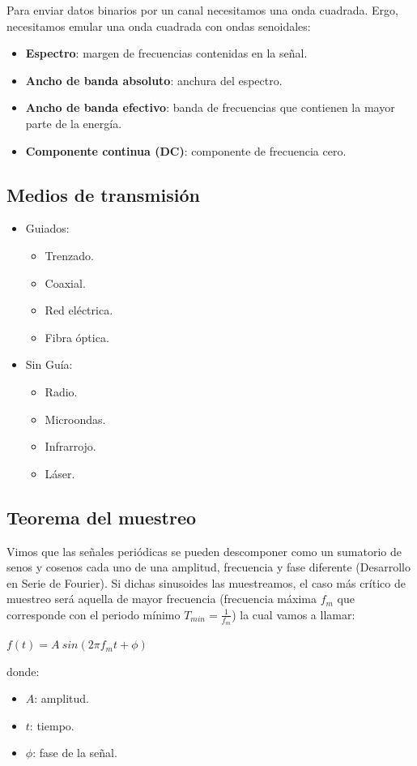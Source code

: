 \documentclass[]{article}
\begin{document}
Para enviar datos binarios por un canal necesitamos una onda cuadrada. Ergo, necesitamos emular una onda cuadrada con ondas senoidales:


\begin{itemize}
    \item \textbf{Espectro}: margen de frecuencias contenidas en la señal.
    \item \textbf{Ancho de banda absoluto}: anchura del espectro.
    \item \textbf{Ancho de banda efectivo}: banda de frecuencias que contienen la mayor parte de la energía.
    \item \textbf{Componente continua (DC)}: componente de frecuencia cero.
\end{itemize}

\subsection{Medios de transmisión}
\begin{itemize}
    \item Guiados:
    \begin{itemize}
        \item Trenzado.
        \item Coaxial.
        \item Red eléctrica.
        \item Fibra óptica.
    \end{itemize}
    \item Sin Guía:
    \begin{itemize}
        \item Radio.
        \item Microondas.
        \item Infrarrojo.
        \item Láser.
    \end{itemize}
\end{itemize}

\subsection{Teorema del muestreo}
Vimos que las señales periódicas se pueden descomponer como un sumatorio de senos y cosenos cada uno de una amplitud, frecuencia y fase diferente (Desarrollo en Serie de Fourier). Si dichas sinusoides las muestreamos, el caso más crítico de muestreo será aquella de mayor frecuencia (frecuencia máxima $f_m$ que corresponde con el periodo mínimo $T_{min}=\frac{1}{f_m}$) la cual vamos a llamar:
\begin{center}
    $f(t)=A\ sin(2\pi f_m t + \phi)$
\end{center}
donde:
\begin{itemize}
    \item $A$: amplitud.
    \item $t$: tiempo.
    \item $\phi$: fase de la señal.
\end{itemize}
\end{document}
